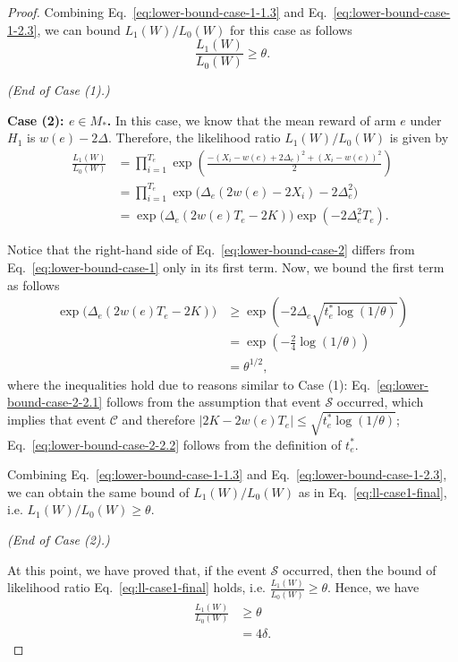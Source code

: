 \documentclass{article}
\begin{document}
\begin{proof}
Combining Eq.~\eqref{eq:lower-bound-case-1-1.3} and Eq.~\eqref{eq:lower-bound-case-1-2.3}, we can bound $L_1(W)/L_0(W)$ for this case as follows
\begin{equation}
\label{eq:ll-case1-final} 
\frac{L_1(W)}{L_0(W)} \ge \theta. 
\end{equation}


\emph{(End of Case (1).)}

\textbf{Case (2): $e\in M_*$.}
In this case, we know that the mean reward of arm $e$ under $H_1$ is $w(e)-2\Delta$.
Therefore, the likelihood ratio $L_1(W)/L_0(W)$ is given by
\begin{align}
  \frac{L_1(W)}{L_0(W)} &= \prod_{i=1}^{T_e} \exp\left(\frac{-(X_i-w(e)+2\Delta_e)^2+(X_i-w(e))^2}{2}\right) \nonumber \\
  						&= \prod_{i=1}^{T_e} \exp\big(\Delta_e(2w(e)-2X_i)-2\Delta_e^2\big) \nonumber \\
  						&= \exp\big(\Delta_e(2w(e)T_e-2K)\big)\exp(-2\Delta_e^2T_e) \label{eq:lower-bound-case-2}.
\end{align}

Notice that the right-hand side of Eq.~\eqref{eq:lower-bound-case-2} differs from Eq.~\eqref{eq:lower-bound-case-1} only in its first term.
Now, we bound the first term as follows
\begin{align}
	\exp\big(\Delta_e(2w(e)T_e-2K)\big) & \ge \exp\left(-2\Delta_e\sqrt{t_e^*\log(1/\theta)}\right) \label{eq:lower-bound-case-2-2.1}\\
								       & = \exp\left(-\frac{2}{4}\log(1/\theta)\right) \label{eq:lower-bound-case-2-2.2}\\
								       &=\theta^{1/2},  \label{eq:lower-bound-case-2-2.3}
\end{align}
where the inequalities hold due to reasons similar to Case (1): Eq.~\eqref{eq:lower-bound-case-2-2.1} follows from the assumption that event $\mathcal S$ occurred, which implies that event $\mathcal C$ and therefore $|2K-2w(e)T_e| \le \sqrt{t_e^*\log(1/\theta)}$; 
Eq.~\eqref{eq:lower-bound-case-2-2.2} follows from the definition of $t_e^*$.

Combining Eq.~\eqref{eq:lower-bound-case-1-1.3} and Eq.~\eqref{eq:lower-bound-case-1-2.3}, we  can obtain the same bound of $L_1(W)/L_0(W)$ as in Eq.~\eqref{eq:ll-case1-final}, i.e. $L_1(W)/L_0(W) \ge \theta$.

\emph{(End of Case (2).)}

At this point, we have proved that, if the event $\mathcal S$ occurred, then the bound of likelihood ratio Eq.~\eqref{eq:ll-case1-final} holds, i.e. $\frac{L_1(W)}{L_0(W)} \ge \theta$.
Hence, we have
\begin{align}
\frac{L_1(W)}{L_0(W)} &\ge \theta \nonumber \\
					  &= 4\delta.	
\end{align}



\end{proof}
\end{document}
